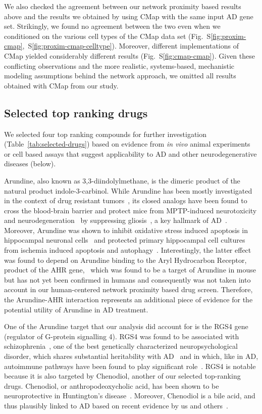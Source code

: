 \documentclass[letterpaper]{article}
\begin{document}
We also checked the agreement between our network proximity based results
above and the results we obtained by using CMap with the same input AD gene
set.  Strikingly, we found no agreement between the two even when we
conditioned on the various cell types of the CMap data set
(Fig.~S\ref{fig:proxim-cmap},~S\ref{fig:proxim-cmap-celltype}).  Moreover,
different implementations of CMap yielded considerably different results
(Fig.~S\ref{fig:cmap-cmap}).  Given these conflicting observations and the
more realistic, systems-based, mechanistic modeling assumptions behind the
network approach, we omitted all results obtained with CMap from our study.

\subsection{Selected top ranking drugs}

We selected four top ranking compounds for further investigation
(Table~\ref{tab:selected-drugs}) based on evidence from \emph{in vivo} animal
experiments or cell based assays that suggest applicability to AD and other
neurodegenerative diseases (below).

Arundine, also known as 3,3-diindolylmethane, is the dimeric product of the
natural product indole-3-carbinol.  While Arundine has been mostly
investigated in the context of drug resistant tumors~\citep{Biersack2020}, its
closed analogs have been found to cross the blood-brain barrier and protect
mice from MPTP-induced neurotoxicity and
neurodegeneration~\citep{DeMiranda2013} by suppressing
gliosis~\citep{DeMiranda2014}, a key hallmark of AD~\citep{DeStrooper2016}.
Moreover, Arundine was shown to inhibit oxidative stress induced apoptosis in
hippocampal neuronal cells~\citep{Lee2019} and protected primary hippocampal
cell cultures from ischemia induced apoptosis and
autophagy~\citep{Rzemieniec2019}.  Interestingly, the latter effect was found
to depend on Arundine binding to the Aryl Hydrocarbon Receptor, product of the
AHR gene,~\citep{Rzemieniec2019} which was found to be a target of Arundine in
mouse but has not yet been confirmed in humans and consequently was not taken
into account in our human-centered network proximity based drug screen.
Therefore, the Arundine-AHR interaction represents an additional piece of
evidence for the potential utility of Arundine in AD treatment.

One of the Arundine target that our analysis did account for is the RGS4 gene
(regulator of G-protein signalling 4). RGS4 was found to be associated with
schizophrenia~\citep{Chowdari2002}, one of the best genetically characterized
neuropsychological disorder, which shares substantial heritability with
AD~\citep{Consortium2018} and in which, like in AD, autoimmune pathways have
been found to play significant role~\citep{Sekar2016a}.  RGS4 is notable
because it is also targeted by Chenodiol, another of our selected top-ranking
drugs.  Chenodiol, or anthropodeoxycholic acid, has been shown to be
neuroprotective in Huntington's disease~\citep{Keene2002}.  Moreover,
Chenodiol is a bile acid, and thus plausibly linked to
AD based on recent evidence by us and others~\citep{Varma2021,Baloni2020}.
\end{document}
